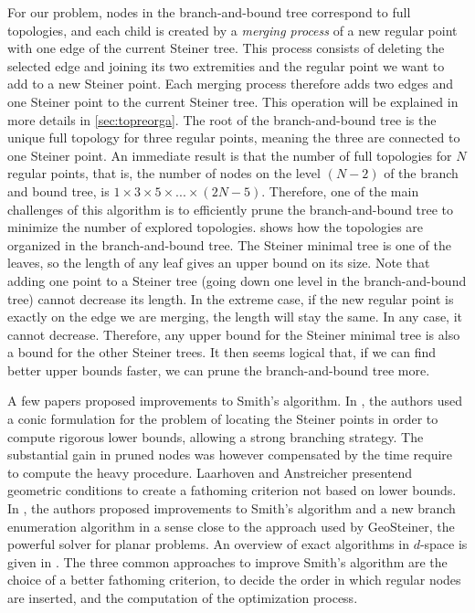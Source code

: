 \documentclass{article}
\theoremstyle{plain}
\begin{document}
For our problem, nodes in the branch-and-bound tree correspond to full topologies, and each child is created by a \emph{merging process} of a new regular point with one edge of the current Steiner tree. 
This process consists of deleting the selected edge and joining its two extremities and the regular point we want to add to a new Steiner point. 
Each merging process therefore adds two edges and one Steiner point to the current Steiner tree. 
This operation will be explained in more details in \cref{sec:topreorga}.
The root of the \mbox{branch-and-bound} tree is the unique full topology for three regular points, meaning the three are connected to one Steiner point. 
An immediate result is that the number of full topologies for $N$ regular points, that is, the number of nodes on the level $(N-2)$ of the branch and bound tree, is $1\times3\times5\times...\times(2N - 5)$. 
Therefore, one of the main challenges of this algorithm is to efficiently prune the branch-and-bound tree to minimize the number of explored topologies. 
 shows how the topologies are organized in the branch-and-bound tree. 
The Steiner minimal tree is one of the leaves, so the length of any leaf gives an upper bound on its size. 
Note that adding one point to a Steiner tree (going down one level in the \mbox{branch-and-bound} tree) cannot decrease its length. In the extreme case, if the new regular point is exactly on the edge we are merging, the length will stay the same. 
In any case, it cannot decrease. Therefore, any upper bound for the Steiner minimal tree is also a bound for the other Steiner trees. 
It then seems logical that, if we can find better upper bounds faster, we can prune the \mbox{branch-and-bound} tree more. 


A few papers proposed improvements to Smith's algorithm. 
In \cite{Fampa}, the authors used a conic formulation for the problem of locating the Steiner points in order to compute rigorous lower bounds, allowing a strong branching strategy. 
The substantial gain in pruned nodes was however compensated by the time require to compute the heavy procedure. 
Laarhoven and Anstreicher\cite{Laarhoven} presentend geometric conditions to create a fathoming criterion not based on lower bounds. 
In \cite{Fonseca}, the authors proposed improvements to Smith's algorithm and a new branch enumeration algorithm in a sense close to the approach used by GeoSteiner, the powerful solver for planar problems. 
An overview of exact algorithms in $d$-space is given in \cite{review}. 
The three common approaches to improve Smith's algorithm are the choice of a better fathoming criterion, to decide the order in which regular nodes are inserted, and the computation of the optimization process.
\end{document}
